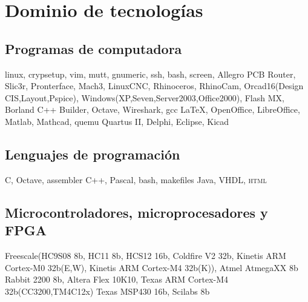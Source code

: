 \documentclass[11pt,a4paper,sans]{moderncv} 	%
\begin{document}
\section{Dominio de tecnologías}
	\subsection{Programas de computadora}
	 	{linux, crypsetup, vim, mutt, gnumeric, ssh, bash, screen, Allegro PCB Router, Slic3r, Pronterface, Mach3, LinuxCNC, Rhinoceros, RhinoCam, Orcad16(Design CIS,Layout,Pspice), Windows(XP,Seven,Server2003,Office2000), Flash MX, Borland C++ Builder, Octave, Wireshark, gcc}
	 	{\LaTeX, OpenOffice, LibreOffice, Matlab, Mathcad, quemu}
	 	{Quartus II, Delphi, Eclipse, Kicad}

	\subsection{Lenguajes de programación}
	 	{C, Octave, assembler}
	 	{C++, Pascal, bash, makefiles}
	 	{Java, VHDL, \textsc{html}}

	\subsection{Microcontroladores, microprocesadores y FPGA}
	 	{Freescale(HC9S08 8b, HC11 8b, HCS12 16b, Coldfire V2 32b, Kinetis ARM Cortex-M0 32b(E,W), Kinetis ARM Cortex-M4 32b(K)), Atmel AtmegaXX 8b}
	 	{Rabbit 2200 8b, Altera Flex 10K10, Texas ARM Cortex-M4 32b(CC3200,TM4C12x)}
	 	{Texas MSP430 16b, Scilabs 8b}
\end{document}
